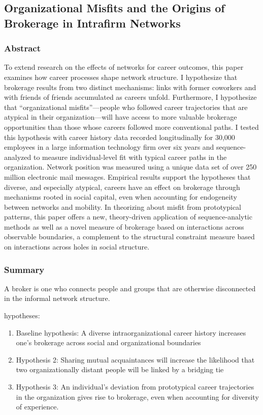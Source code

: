\documentclass[12pt]{article}
\begin{document}
\subsection*{Organizational Misfits and the Origins of Brokerage in Intrafirm Networks\cite{misfits}}

\subsubsection*{Abstract}
To extend research on the effects of networks for career outcomes, this paper examines how career processes shape network structure. I hypothesize that brokerage results from two distinct mechanisms: links with former coworkers and with friends of friends accumulated as careers unfold. Furthermore, I hypothesize that “organizational misfits”—people who followed career trajectories that are atypical in their organization—will have access to more valuable brokerage opportunities than those whose careers followed more conventional paths. I tested this hypothesis with career history data recorded longitudinally for 30,000 employees in a large information technology firm over six years and sequence-analyzed to measure individual-level fit with typical career paths in the organization. Network position was measured using a unique data set of over 250 million electronic mail messages. Empirical results support the hypotheses that diverse, and especially atypical, careers have an effect on brokerage through mechanisms rooted in social capital, even when accounting for endogeneity between networks and mobility. In theorizing about misfit from prototypical patterns, this paper offers a new, theory-driven application of sequence-analytic methods as well as a novel measure of brokerage based on interactions across observable boundaries, a complement to the structural constraint measure based on interactions across holes in social structure.

\subsubsection*{Summary}

A broker is one who connects people and groups that are otherwise disconnected in the informal network structure. 

hypotheses:

\begin{enumerate}
    \item Baseline hypothesis: A diverse intraorganizational career history increases one's brokerage across social and organizational boundaries
    \item Hypothesis 2: Sharing mutual acquaintances will increase the likelihood that two organizationally distant people will be linked by a bridging tie
    \item Hypothesis 3: An individual's deviation from prototypical career trajectories in the organization gives rise to brokerage, even when accounting for diversity of experience.
\end{enumerate}
\end{document}
